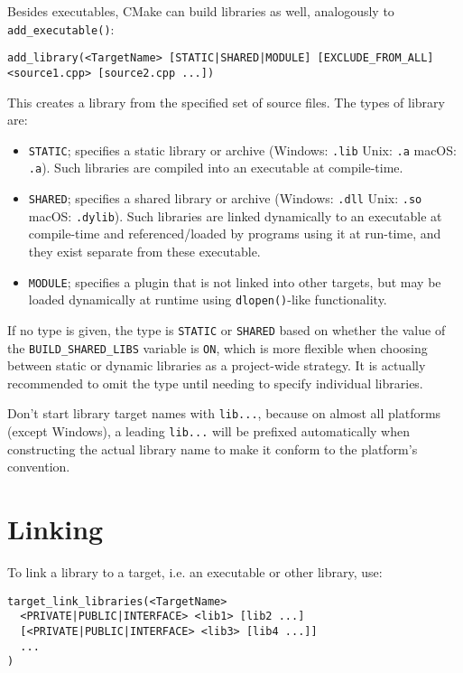 \documentclass[8pt, table, xcdraw]{article}%
\begin{document}
Besides executables, CMake can build libraries as well, analogously to \lstinline{add_executable()}:

\begin{lstlisting}
add_library(<TargetName> [STATIC|SHARED|MODULE] [EXCLUDE_FROM_ALL] <source1.cpp> [source2.cpp ...])
\end{lstlisting}

This creates a library from the specified set of source files. The types of library are:

\begin{itemize}
    \item \lstinline{STATIC}; specifies a static library or archive (Windows: \lstinline{.lib} Unix: \lstinline{.a} macOS: \lstinline{.a}). Such libraries are compiled into an executable at compile-time.
    \item \lstinline{SHARED}; specifies a shared library or archive (Windows: \lstinline{.dll} Unix: \lstinline{.so} macOS: \lstinline{.dylib}). Such libraries are linked dynamically to an executable at compile-time and referenced/loaded by programs using it at run-time, and they exist separate from these executable.
    \item \lstinline{MODULE}; specifies a plugin that is not linked into other targets, but may be loaded dynamically at runtime using \lstinline{dlopen()}-like functionality.
\end{itemize}

If no type is given, the type is \lstinline{STATIC} or \lstinline{SHARED} based on whether the value of the \lstinline{BUILD_SHARED_LIBS} variable is \lstinline{ON}, which is more flexible when choosing between static or dynamic libraries as a project-wide strategy. It is actually recommended to omit the type until needing to specify individual libraries.

Don't start library target names with \lstinline{lib...}, because on almost all
platforms (except Windows), a leading \lstinline{lib...} will be prefixed automatically when constructing the actual library name to make it conform to the platform's convention.

\section{Linking}

To link a library to a target, i.e. an executable or other library, use:

\begin{lstlisting}
target_link_libraries(<TargetName>
  <PRIVATE|PUBLIC|INTERFACE> <lib1> [lib2 ...]
  [<PRIVATE|PUBLIC|INTERFACE> <lib3> [lib4 ...]]
  ...
)
\end{lstlisting}
\end{document}
